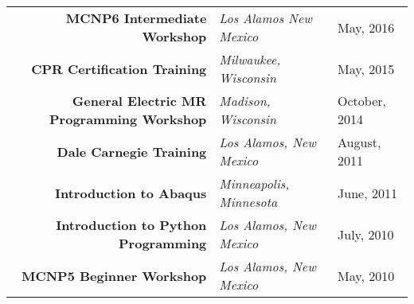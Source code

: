 \begin{minipage}{\textwidth}
\begin{center}
	\begin{tabular}{rll}
	\textbf{MCNP6 Intermediate Workshop} &  \textit{Los Alamos New Mexico} & May, 2016 \\
	\textbf{CPR Certification Training}  &  \textit{Milwaukee, Wisconsin} & May, 2015 \\
	\textbf{General Electric MR Programming Workshop} & \textit{Madison, Wisconsin} & October, 2014 \\
	\textbf{Dale Carnegie Training} & \textit{Los Alamos, New Mexico} &  August, 2011 \\
	\textbf{Introduction to Abaqus} & \textit{Minneapolis, Minnesota} & June, 2011 \\
	\textbf{Introduction to Python Programming} & \textit{Los Alamos, New Mexico} & July, 2010 \\
	\textbf{MCNP5 Beginner Workshop} & \textit{Los Alamos, New Mexico} & May, 2010 \\
	\end{tabular}
\end{center}
\end{minipage}

%

%
%

